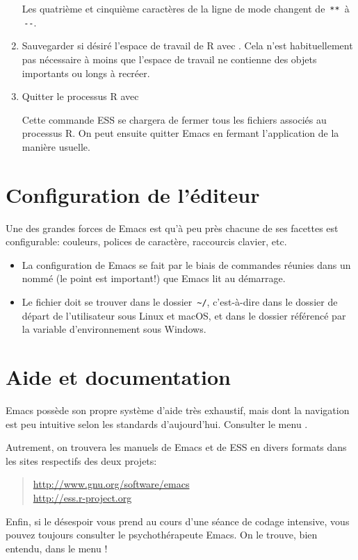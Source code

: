 \begin{enumerate}
  Les quatrième et cinquième caractères de la ligne de mode changent
  de \,\verb|**|\, à \,\verb|--|.
\item Sauvegarder si désiré l'espace de travail de R avec
  . Cela n'est
  habituellement pas nécessaire à moins que l'espace de travail ne
  contienne des objets importants ou longs à recréer.
\item Quitter le processus R avec
  \begin{quote}
  \end{quote}
  Cette commande ESS se chargera de fermer tous les fichiers associés
  au processus R. On peut ensuite quitter Emacs en fermant
  l'application de la manière usuelle.
\end{enumerate}



\section{Configuration de l'éditeur}
\label{emacs+ess:configuration}

Une des grandes forces de Emacs est qu'à peu près chacune de ses
facettes est configurable: couleurs, polices de caractère, raccourcis
clavier, etc.

\begin{itemize}
\item La configuration de Emacs se fait par le biais de commandes
  réunies dans un  nommé  (le point est important!) que
  Emacs lit au démarrage.
\item Le fichier  doit se trouver dans le dossier
  \,\verb=~/=, c'est-à-dire dans le dossier de départ de l'utilisateur
  sous Linux et macOS, et dans le dossier référencé par la variable
  d'environnement  sous Windows.
\end{itemize}


\section{Aide et documentation}
\label{emacs+ess:aide}

Emacs possède son propre système d'aide très exhaustif, mais dont la
navigation est peu intuitive selon les standards d'aujourd'hui.
Consulter le menu .

Autrement, on trouvera les manuels de Emacs et de ESS en divers
formats dans les sites respectifs des deux projets:
\begin{quote}
  \url{http://www.gnu.org/software/emacs} \\
  \url{http://ess.r-project.org}
\end{quote}

Enfin, si le désespoir vous prend au cours d'une séance de codage
intensive, vous pouvez toujours consulter le psychothérapeute Emacs.
On le trouve, bien entendu, dans le menu !


